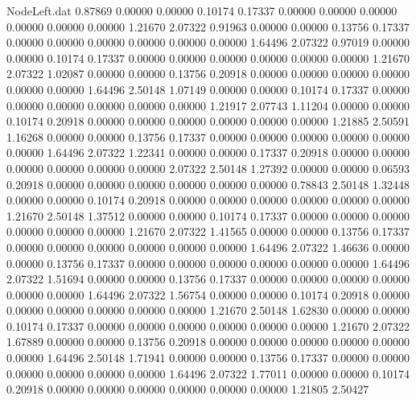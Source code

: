 \begin{filecontents}{NodeLeft.dat}
   0.87869    0.00000    0.00000     0.10174    0.17337    0.00000    0.00000    0.00000    0.00000    0.00000    0.00000    1.21670    2.07322
   0.91963    0.00000    0.00000     0.13756    0.17337    0.00000    0.00000    0.00000    0.00000    0.00000    0.00000    1.64496    2.07322
   0.97019    0.00000    0.00000     0.10174    0.17337    0.00000    0.00000    0.00000    0.00000    0.00000    0.00000    1.21670    2.07322
   1.02087    0.00000    0.00000     0.13756    0.20918    0.00000    0.00000    0.00000    0.00000    0.00000    0.00000    1.64496    2.50148
   1.07149    0.00000    0.00000     0.10174    0.17337    0.00000    0.00000    0.00000    0.00000    0.00000    0.00000    1.21917    2.07743
   1.11204    0.00000    0.00000     0.10174    0.20918    0.00000    0.00000    0.00000    0.00000    0.00000    0.00000    1.21885    2.50591
   1.16268    0.00000    0.00000     0.13756    0.17337    0.00000    0.00000    0.00000    0.00000    0.00000    0.00000    1.64496    2.07322
   1.22341    0.00000    0.00000     0.17337    0.20918    0.00000    0.00000    0.00000    0.00000    0.00000    0.00000    2.07322    2.50148
   1.27392    0.00000    0.00000     0.06593    0.20918    0.00000    0.00000    0.00000    0.00000    0.00000    0.00000    0.78843    2.50148
   1.32448    0.00000    0.00000     0.10174    0.20918    0.00000    0.00000    0.00000    0.00000    0.00000    0.00000    1.21670    2.50148
   1.37512    0.00000    0.00000     0.10174    0.17337    0.00000    0.00000    0.00000    0.00000    0.00000    0.00000    1.21670    2.07322
   1.41565    0.00000    0.00000     0.13756    0.17337    0.00000    0.00000    0.00000    0.00000    0.00000    0.00000    1.64496    2.07322
   1.46636    0.00000    0.00000     0.13756    0.17337    0.00000    0.00000    0.00000    0.00000    0.00000    0.00000    1.64496    2.07322
   1.51694    0.00000    0.00000     0.13756    0.17337    0.00000    0.00000    0.00000    0.00000    0.00000    0.00000    1.64496    2.07322
   1.56754    0.00000    0.00000     0.10174    0.20918    0.00000    0.00000    0.00000    0.00000    0.00000    0.00000    1.21670    2.50148
   1.62830    0.00000    0.00000     0.10174    0.17337    0.00000    0.00000    0.00000    0.00000    0.00000    0.00000    1.21670    2.07322
   1.67889    0.00000    0.00000     0.13756    0.20918    0.00000    0.00000    0.00000    0.00000    0.00000    0.00000    1.64496    2.50148
   1.71941    0.00000    0.00000     0.13756    0.17337    0.00000    0.00000    0.00000    0.00000    0.00000    0.00000    1.64496    2.07322
   1.77011    0.00000    0.00000     0.10174    0.20918    0.00000    0.00000    0.00000    0.00000    0.00000    0.00000    1.21805    2.50427

\end{filecontents}
